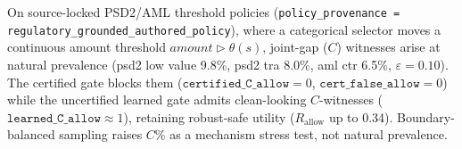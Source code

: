 On source-locked PSD2/AML threshold policies (\texttt{policy\_provenance = regulatory\_grounded\_authored\_policy}), where a categorical selector moves a continuous amount threshold $\textit{amount} \triangleright \theta(s)$, joint-gap ($C$) witnesses arise at natural prevalence (psd2 low value 9.8\%, psd2 tra 8.0\%, aml ctr 6.5\%, $\varepsilon=0.10$). The certified gate blocks them ($\texttt{certified\_C\_allow}=0$, $\texttt{cert\_false\_allow}=0$) while the uncertified learned gate admits clean-looking $C$-witnesses ($\texttt{learned\_C\_allow}\approx1$), retaining robust-safe utility ($R_{\mathrm{allow}}$ up to 0.34). Boundary-balanced sampling raises $C\%$ as a mechanism stress test, not natural prevalence.
